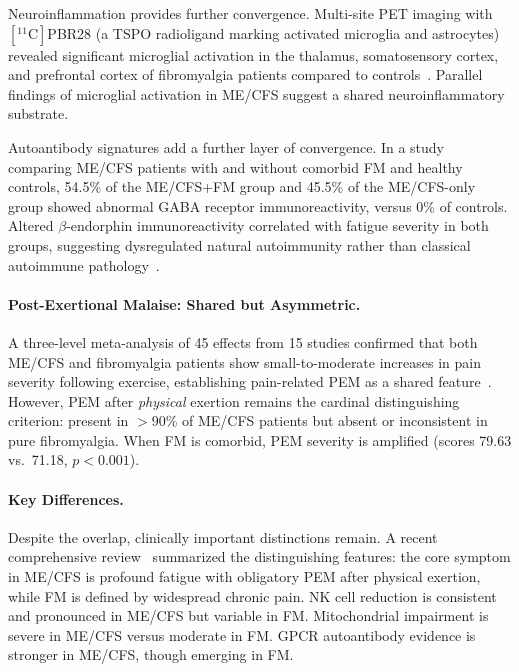 Neuroinflammation provides further convergence. Multi-site PET imaging with $[^{11}\mathrm{C}]$PBR28 (a TSPO radioligand marking activated microglia and astrocytes) revealed significant microglial activation in the thalamus, somatosensory cortex, and prefrontal cortex of fibromyalgia patients compared to controls~\cite{Albrecht2019FMglial}. Parallel findings of microglial activation in ME/CFS suggest a shared neuroinflammatory substrate.

Autoantibody signatures add a further layer of convergence. In a study comparing ME/CFS patients with and without comorbid FM and healthy controls, 54.5\% of the ME/CFS+FM group and 45.5\% of the ME/CFS-only group showed abnormal GABA receptor immunoreactivity, versus 0\% of controls. Altered $\beta$-endorphin immunoreactivity correlated with fatigue severity in both groups, suggesting dysregulated natural autoimmunity rather than classical autoimmune pathology~\cite{Ryabkova2023autoantibodies}.

\paragraph{Post-Exertional Malaise: Shared but Asymmetric.}

A three-level meta-analysis of 45 effects from 15 studies confirmed that both ME/CFS and fibromyalgia patients show small-to-moderate increases in pain severity following exercise, establishing pain-related PEM as a shared feature~\cite{Barhorst2022painPEM}. However, PEM after \textit{physical} exertion remains the cardinal distinguishing criterion: present in $>$90\% of ME/CFS patients but absent or inconsistent in pure fibromyalgia. When FM is comorbid, PEM severity is amplified (scores 79.63 vs.\ 71.18, $p<0.001$).

\paragraph{Key Differences.}

Despite the overlap, clinically important distinctions remain. A recent comprehensive review~\cite{Murovska2026overlap} summarized the distinguishing features: the core symptom in ME/CFS is profound fatigue with obligatory PEM after physical exertion, while FM is defined by widespread chronic pain. NK cell reduction is consistent and pronounced in ME/CFS but variable in FM. Mitochondrial impairment is severe in ME/CFS versus moderate in FM. GPCR autoantibody evidence is stronger in ME/CFS, though emerging in FM.

